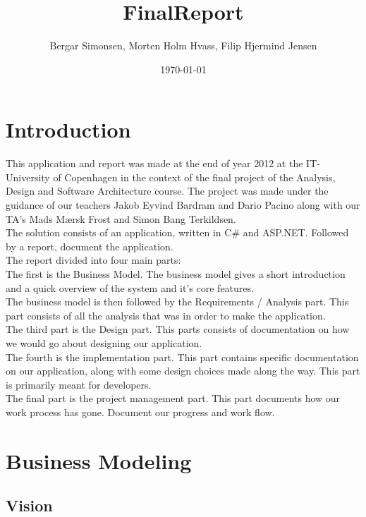 \documentclass[11pt]{article}
\title{FinalReport}
\author{Bergar Simonsen, Morten Holm Hvass, Filip Hjermind Jensen}
\date{\today}
\begin{document}
\maketitle

\setcounter{tocdepth}{3}
\tableofcontents
\vspace*{1cm}
\newpage
\section{Introduction}
\label{sec-0}
This application and report was made at the end of year 2012 at the IT-University of Copenhagen in the context of the final project of the Analysis, Design and Software Architecture course. The project was made under the guidance of our teachers Jakob Eyvind Bardram and Dario Pacino along with our TA's Mads Mærsk Frost and Simon Bang Terkildsen. \\

The solution consists of an application, written in C\# and ASP.NET. Followed by a report, document the application. \\

The report divided into four main parts: \\

The first is the Business Model. The business model gives a short introduction and a quick overview of the system and it's core features. \\
The business model is then followed by the Requirements / Analysis part. This part consists of all the analysis that was in order to make the application. \\
The third part is the Design part. This parts consists of documentation on how we would go about designing our application. \\
The fourth is the implementation part. This part contains specific documentation on our application, along with some design choices made along the way. This part is primarily meant for developers. \\
The final part is the project management part. This part documents how our work process has gone. Document our progress and work flow.

\newpage

\section{Business Modeling}
\label{sec-1}
\subsection{Vision}
\label{sec-1-1}
\end{document}
